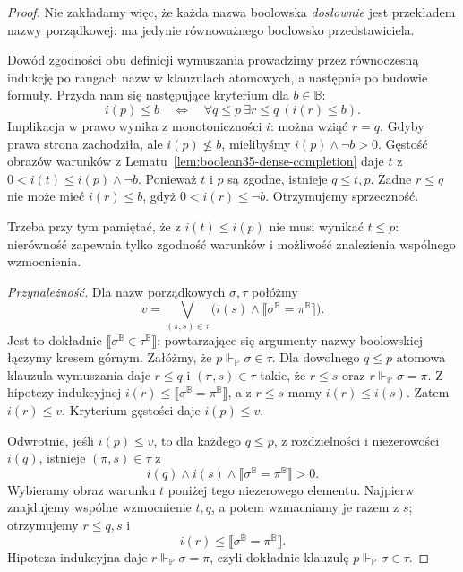 \begin{proof}
Nie zakładamy więc, że każda
nazwa boolowska \emph{dosłownie}
jest przekładem nazwy
porządkowej: ma jedynie
równoważnego boolowsko
przedstawiciela.

Dowód zgodności obu definicji
wymuszania prowadzimy przez
równoczesną indukcję po rangach
nazw w klauzulach atomowych,
a następnie po budowie formuły.
Przyda nam się następujące
kryterium dla $b\in\mathbb B$:
\[
 i(p)\le b
 \quad\Longleftrightarrow\quad
 \forall q\le p\ \exists r\le q\
              (i(r)\le b).
\]
Implikacja w prawo wynika
z monotoniczności $i$:
można wziąć $r=q$.
Gdyby prawa strona zachodziła,
ale $i(p)\not\le b$, mielibyśmy
$i(p)\wedge\neg b>0$.
Gęstość obrazów warunków z
Lematu~\ref{lem:boolean35-dense-completion}
daje $t$ z
$0<i(t)\le i(p)\wedge\neg b$.
Ponieważ $t$ i $p$ są zgodne,
istnieje $q\le t,p$.
Żadne $r\le q$ nie może mieć
$i(r)\le b$, gdyż
$0<i(r)\le\neg b$.
Otrzymujemy sprzeczność.

Trzeba przy tym pamiętać,
że z $i(t)\le i(p)$
nie musi wynikać $t\le p$:
nierówność zapewnia tylko
zgodność warunków i możliwość
znalezienia wspólnego
wzmocnienia.

\emph{Przynależność.}
Dla nazw porządkowych
$\sigma,\tau$ połóżmy
\[
 v=\bigvee_{(\pi,s)\in\tau}
       \bigl(i(s)\wedge
          \llbracket\sigma^{\mathbb B}
                    =\pi^{\mathbb B}
          \rrbracket\bigr).
\]
Jest to dokładnie
$\llbracket\sigma^{\mathbb B}
            \in\tau^{\mathbb B}\rrbracket$;
powtarzające się argumenty
nazwy boolowskiej łączymy
kresem górnym.
Załóżmy, że
$p\Vdash_{\mathbb P}\sigma\in\tau$.
Dla dowolnego $q\le p$ atomowa
klauzula wymuszania daje
$r\le q$ i $(\pi,s)\in\tau$
takie, że $r\le s$ oraz
$r\Vdash_{\mathbb P}\sigma=\pi$.
Z hipotezy indukcyjnej
$i(r)\le\llbracket
\sigma^{\mathbb B}=\pi^{\mathbb B}
\rrbracket$, a z $r\le s$
mamy $i(r)\le i(s)$.
Zatem $i(r)\le v$.
Kryterium gęstości daje
$i(p)\le v$.

Odwrotnie, jeśli $i(p)\le v$,
to dla każdego $q\le p$,
z rozdzielności i niezerowości
$i(q)$, istnieje $(\pi,s)\in\tau$
z
\[
 i(q)\wedge i(s)\wedge
 \llbracket\sigma^{\mathbb B}
          =\pi^{\mathbb B}\rrbracket>0.
\]
Wybieramy obraz warunku $t$
poniżej tego niezerowego
elementu. Najpierw znajdujemy
wspólne wzmocnienie $t,q$,
a potem wzmacniamy je
razem z $s$; otrzymujemy
$r\le q,s$ i
\[
 i(r)\le\llbracket
 \sigma^{\mathbb B}=\pi^{\mathbb B}
 \rrbracket.
\]
Hipoteza indukcyjna daje
$r\Vdash_{\mathbb P}\sigma=\pi$,
czyli dokładnie klauzulę
$p\Vdash_{\mathbb P}\sigma\in\tau$.


\end{proof}
